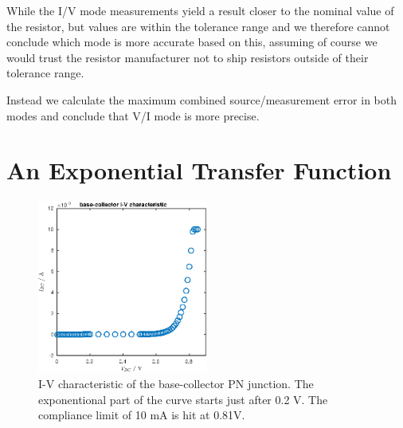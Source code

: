 While the I/V mode measurements yield a result closer to the nominal value of the resistor,
but values are within the tolerance range and we therefore cannot conclude which mode is more
accurate based on this, assuming of course we would trust the resistor manufacturer not to 
ship resistors outside of their tolerance range.

Instead we calculate the maximum combined source/measurement error in both modes and conclude
that V/I mode is more precise.

\section{An Exponential Transfer Function}
\begin{figure}
    \center
    \includegraphics[width=0.5\textwidth]{ivc.eps}
    \caption{I-V characteristic of the base-collector PN junction. The exponentional part of the curve
    starts just after 0.2 V. The compliance limit of 10 mA is hit at 0.81V.}
    \label{fig:ivc}
\end{figure}

